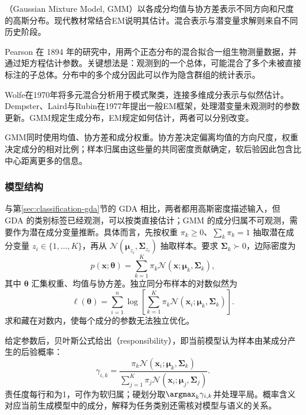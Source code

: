 （Gaussian Mixture Model, GMM）以各成分均值与协方差表示不同方向和尺度的高斯分布。现代教材常结合EM说明其估计。混合表示与潜变量求解则来自不同历史阶段。

Pearson 在 1894 年的研究中，用两个正态分布的混合拟合一组生物测量数据，并通过矩方程估计参数。关键想法是：观测到的一个总体，可能混合了多个未被直接标注的子总体。分布中的多个成分因此可以作为隐含群组的统计表示。

Wolfe在1970年将多元混合分析用于模式聚类，连接多维成分表示与似然估计。Dempster、Laird与Rubin在1977年提出一般EM框架，处理潜变量未观测时的参数更新。GMM规定生成分布，EM规定如何估计，两者可以分别改变。

GMM同时使用均值、协方差和成分权重。协方差决定偏离均值的方向尺度，权重决定成分的相对比例；样本归属由这些量的共同密度贡献确定，软后验因此包含比中心距离更多的信息。

\subsubsection{模型结构}

与第\ref{sec:classification-gda}节的 GDA 相比，两者都用高斯密度描述输入，但 GDA 的类别标签已经观测，可以按类直接估计；GMM 的成分归属不可观测，需要作为潜在成分变量推断。具体而言，先按权重 $\pi_k\geq0$、$\sum_k\pi_k=1$ 抽取潜在成分变量 $z_i\in\{1,\ldots,K\}$，再从 $\mathcal{N}(\bm{\mu}_{z_i},\bm{\Sigma}_{z_i})$ 抽取样本。要求 $\bm{\Sigma}_k\succ0$，边际密度为
\begin{equation}
 p(\bm{x};\bm{\theta})
 =\sum_{k=1}^K\pi_k
   \mathcal{N}(\bm{x};\bm{\mu}_k,\bm{\Sigma}_k),
 \label{eq:clustering-gmm}
\end{equation}
其中 $\bm{\theta}$ 汇集权重、均值与协方差。独立同分布样本的对数似然为
\[
 \ell(\bm{\theta})
 =\sum_{i=1}^n\log\left[
 \sum_{k=1}^K\pi_k
 \mathcal{N}(\bm{x}_i;\bm{\mu}_k,\bm{\Sigma}_k)\right].
\]
求和藏在对数内，使每个成分的参数无法独立优化。

给定参数后，贝叶斯公式给出（responsibility），即当前模型认为样本由某成分产生的后验概率：
\begin{equation}
 \gamma_{i,k}
 =\frac{\pi_k\mathcal{N}(\bm{x}_i;\bm{\mu}_k,\bm{\Sigma}_k)}
 {\sum_{j=1}^K\pi_j
       \mathcal{N}(\bm{x}_i;\bm{\mu}_j,\bm{\Sigma}_j)}.
 \label{eq:clustering-responsibility}
\end{equation}
责任度每行和为1，可作为软归属；硬划分取$\argmax_k\gamma_{i,k}$并处理平局。概率含义对应当前生成模型中的成分，解释为任务类别还需核对模型与语义的关系。

